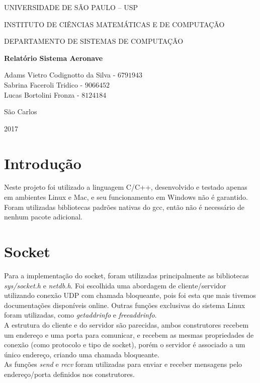 \documentclass[10pt,a4paper]{article}
\newcommand*\NewPage{\newpage\null\thispagestyle{empty}\newpage}
\begin{document}
\thispagestyle{empty}
\begin{center}
	UNIVERSIDADE DE SÃO PAULO – USP
	
	INSTITUTO DE CIÊNCIAS MATEMÁTICAS E DE COMPUTAÇÃO
	
	DEPARTAMENTO DE SISTEMAS DE COMPUTAÇÃO
	
	\vspace{7cm}
	
	\Large{\textbf{Relatório Sistema Aeronave}}\\
	
	\vspace{6cm}
	
	Adams Vietro Codignotto da Silva - $6791943$ \\ 
	Sabrina Faceroli Tridico - $9066452$\\
	Lucas Bortolini Fronza - $8124184$\\
	
		
	
	\vspace{6cm}
	
	São Carlos
	
	2017
\end{center}

\NewPage
{}

\tableofcontents

\newpage

\section{Introdução}
Neste projeto foi utilizado a linguagem C/C++, desenvolvido e testado apenas em ambientes Linux e Mac, e seu funcionamento em Windows não é garantido. Foram utilizadas bibliotecas padrões nativas do gcc, então não é necessário de nenhum pacote adicional.
\section{Socket}
Para a implementação do socket, foram utilizadas principalmente as bibliotecas \textit{sys/socket.h} e \textit{netdb.h}. Foi escolhida uma abordagem de cliente/servidor utilizando conexão UDP com chamada bloqueante, pois foi esta que mais tivemos documentações disponíveis online. Outras funções exclusivas do sistema Linux foram utilizadas, como \textit{getaddrinfo} e \textit{freeaddrinfo}.\\
A estrutura do cliente e do servidor são parecidas, ambos construtores recebem um endereço e uma porta para comunicar, e recebem as mesmas propriedades de conexão (como protocolo e tipo de socket), porém o servidor é associado a um único endereço, criando uma chamada bloqueante.\\
As funções \textit{send} e \textit{recv} foram utilizadas para enviar e receber mensagens pelo endereço/porta definidos nos construtores.
\end{document}
